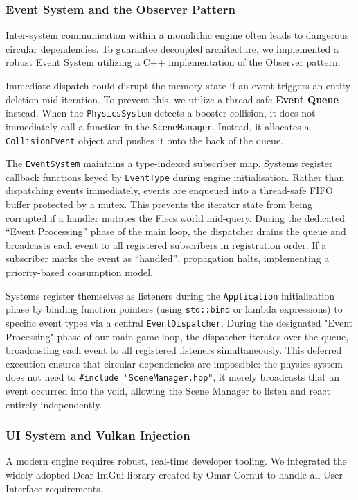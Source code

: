 \documentclass[acmtog, nonacm]{acmart}
\begin{document}
\subsubsection{Event System and the Observer Pattern}
Inter-system communication within a monolithic engine often leads to dangerous circular dependencies. To guarantee decoupled architecture, we implemented a robust Event System utilizing a C++ implementation of the Observer pattern.

Immediate dispatch could disrupt the memory state if an event triggers an entity deletion mid-iteration. To prevent this, we utilize a thread-safe \textbf{Event Queue} instead. When the \texttt{PhysicsSystem} detects a booster collision, it does not immediately call a function in the \texttt{SceneManager}. Instead, it allocates a \texttt{CollisionEvent} object and pushes it onto the back of the queue.

The \texttt{EventSystem} maintains a type-indexed subscriber map. Systems register callback functions keyed by \texttt{EventType} during engine initialisation. Rather than dispatching events immediately, events are enqueued into a thread-safe FIFO buffer protected by a mutex. This prevents the iterator state from being corrupted if a handler mutates the Flecs world mid-query. During the dedicated ``Event Processing'' phase of the main loop, the dispatcher drains the queue and broadcasts each event to all registered subscribers in registration order. If a subscriber marks the event as ``handled'', propagation halts, implementing a priority-based consumption model.

Systems register themselves as listeners during the \texttt{Application} initialization phase by binding function pointers (using \texttt{std::bind} or lambda expressions) to specific event types via a central \texttt{EventDispatcher}. During the designated "Event Processing" phase of our main game loop, the dispatcher iterates over the queue, broadcasting each event to all registered listeners simultaneously. This deferred execution ensures that circular dependencies are impossible: the physics system does not need to \texttt{\#include "SceneManager.hpp"}, it merely broadcasts that an event occurred into the void, allowing the Scene Manager to listen and react entirely independently.

\subsubsection{UI System and Vulkan Injection}
A modern engine requires robust, real-time developer tooling. We integrated the widely-adopted Dear ImGui library \cite{ImGui} created by Omar Cornut to handle all User Interface requirements.
\end{document}
